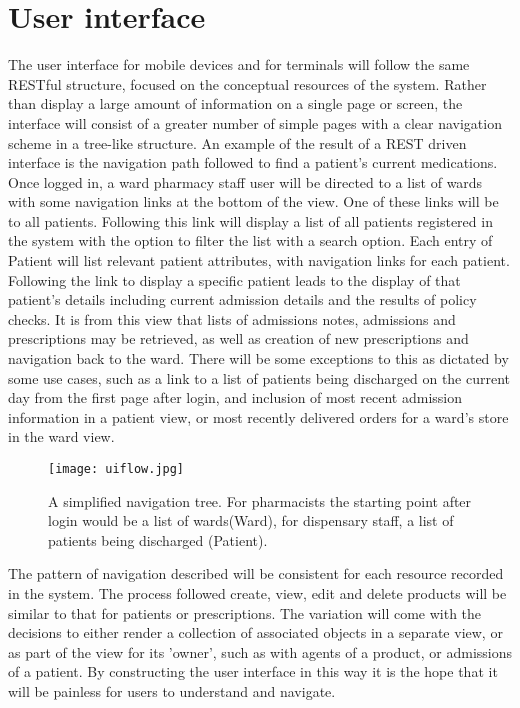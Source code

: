 \documentclass[letterpaper]{amsart}
\begin{document}
\section{User interface}
The user interface for mobile devices and for terminals will follow the same RESTful structure, focused on the conceptual resources of the system.  Rather than display a large amount of information on a single page or screen, the interface will consist of a greater number of simple pages with a clear navigation scheme in a tree-like structure.  An example of the result of a REST driven interface is the navigation path followed to find a patient's current medications.  Once logged in, a ward pharmacy staff user will be directed to a list of wards with some navigation links at the bottom of the view.  One of these links will be to all patients.  Following this link will display a list of all patients registered in the system with the option to filter the list with a search option.  Each entry of Patient will list relevant patient attributes, with navigation links for each patient.  Following the link to display a specific patient leads to the display of that patient's details including current admission details and the results of policy checks.  It is from this view that lists of admissions notes, admissions and prescriptions may be retrieved, as well as creation of new prescriptions and navigation back to the ward.  There will be some exceptions to this as dictated by some use cases, such as a link to a list of patients being discharged on the current day from the first page after login, and inclusion of most recent admission information in a patient view, or most recently delivered orders for a ward's store in the ward view.\\
\begin{figure}[]
    \centering
   \texttt{[image: uiflow.jpg]}
   \caption{A simplified navigation tree.  For pharmacists the starting point after login would be a list of wards(Ward), for dispensary staff, a list of patients being discharged (Patient).}\label{uiflow}
\end{figure}
The pattern of navigation described will be consistent for each resource recorded in the system.  The process followed create, view, edit and delete products will be similar to that for patients or prescriptions.  The variation will come with the decisions to either render a collection of associated objects in a separate view, or as part of the view for its 'owner', such as with agents of a product, or admissions of a patient.  By constructing the user interface in this way it is the hope that it will be painless for users to understand and navigate.\\
\end{document}
